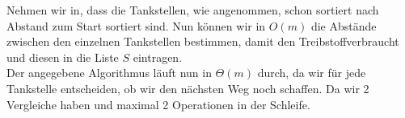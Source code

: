 \documentclass[11pt,a4paper,ngerman]{article}
\begin{document}
Nehmen wir in, dass die Tankstellen, wie angenommen, schon sortiert nach Abstand zum Start sortiert sind. Nun können wir in $O(m)$ die Abstände zwischen den einzelnen Tankstellen bestimmen, damit den Treibstoffverbraucht und diesen in die Liste $S$ eintragen.\\

Der angegebene Algorithmus läuft nun in $\Theta (m)$ durch, da wir für jede Tankstelle entscheiden, ob wir den nächsten Weg noch schaffen. Da wir 2 Vergleiche haben und maximal 2 Operationen in der Schleife.

\label{LastPage}
\end{document}
